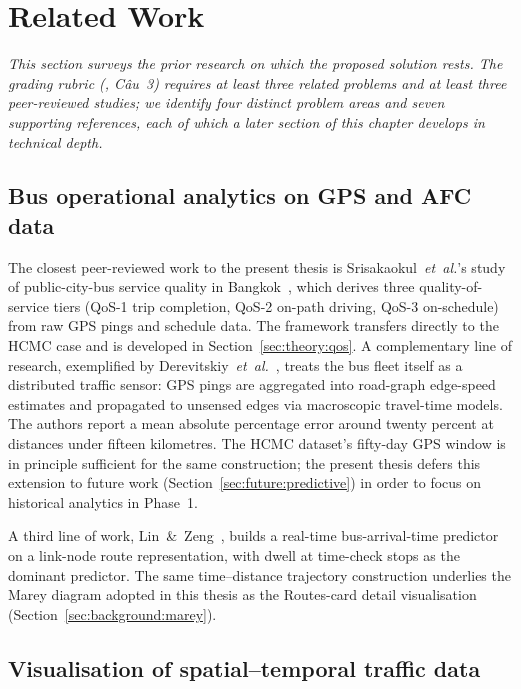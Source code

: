 \section{Related Work}
\label{sec:background:related}

\noindent\textit{This section surveys the prior research on
which the proposed solution rests. The grading rubric
(\cite{rubric}, Câu~3) requires at least three related problems
and at least three peer-reviewed studies; we identify four
distinct problem areas and seven supporting references, each of
which a later section of this chapter develops in technical
depth.}

\subsection{Bus operational analytics on GPS and AFC data}
\label{sec:background:related:ops}

The closest peer-reviewed work to the present thesis is
Srisakaokul~\textit{et~al.}'s study of public-city-bus service
quality in Bangkok~\cite{srisakaokul2023}, which derives three
quality-of-service tiers (QoS-1 trip completion, QoS-2 on-path
driving, QoS-3 on-schedule) from raw GPS pings and schedule
data. The framework transfers directly to the HCMC case and is
developed in Section~\ref{sec:theory:qos}.
A complementary line of research, exemplified by
Derevitskiy~\textit{et~al.}~\cite{derevitskiy2016}, treats the
bus fleet itself as a distributed traffic sensor: GPS pings are
aggregated into road-graph edge-speed estimates and propagated
to unsensed edges via macroscopic travel-time models. The
authors report a mean absolute percentage error around twenty
percent at distances under fifteen kilometres. The HCMC dataset's
fifty-day GPS window is in principle sufficient for the same
construction; the present thesis defers this extension to future
work (Section~\ref{sec:future:predictive}) in order to focus on
historical analytics in Phase~1.

A third line of work, Lin~\&~Zeng~\cite{linzeng2014}, builds a
real-time bus-arrival-time predictor on a link-node route
representation, with dwell at time-check stops as the dominant
predictor. The same time--distance trajectory construction
underlies the Marey diagram adopted in this thesis as the
Routes-card detail visualisation
(Section~\ref{sec:background:marey}).

\subsection{Visualisation of spatial--temporal traffic data}
\label{sec:background:related:viz}


